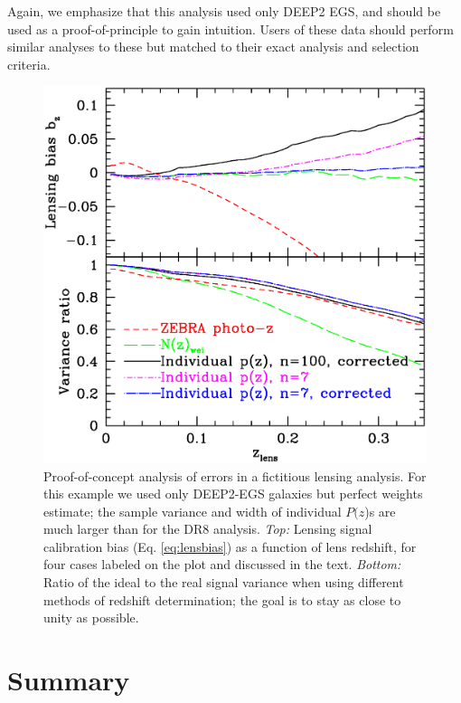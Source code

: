\documentclass[preprint]{aastex}
\newcommand{\pofz}{$P(z$)}
\begin{document}
Again, we emphasize that this analysis used only DEEP2 EGS, and should be used
as a proof-of-principle to gain intuition.  Users of these data should perform
similar analyses to these but matched to their exact analysis and selection
criteria.

\begin{figure} [h]\centering
    \includegraphics[scale=0.5]{figures/pz.egs.c3n7.paper.ps}

    \caption{ Proof-of-concept analysis of errors in a fictitious lensing
    analysis.  For this example we used only DEEP2-EGS galaxies but perfect
    weights estimate; the sample variance and width of individual \pofz s are
    much larger than for the DR8 analysis.  {\em Top:} Lensing signal
    calibration bias (Eq.  \ref{eq:lensbias}) as a function of lens redshift,
    for four  cases labeled on the plot and discussed in the text.  {\em
    Bottom:}  Ratio of the ideal to the real signal variance when using
    different  methods of redshift determination; the goal is to stay as close
    to unity as possible. \label{fig:simplebias}}

\end{figure}




\section{Summary} \label{sec:summary}
\end{document}
